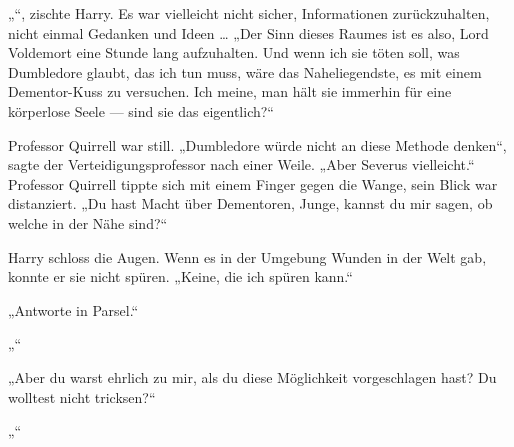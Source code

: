 „“, zischte Harry.
Es war vielleicht nicht sicher, Informationen zurückzuhalten, nicht einmal Gedanken und Ideen …
„Der Sinn dieses Raumes ist es also, Lord Voldemort eine Stunde lang aufzuhalten. Und wenn ich sie töten soll, was Dumbledore glaubt, das ich tun muss, wäre das Naheliegendste, es mit einem Dementor-Kuss zu versuchen. Ich meine, man hält sie immerhin für eine körperlose Seele — sind sie das eigentlich?“

Professor Quirrell war still.
„Dumbledore würde nicht an diese Methode denken“, sagte der Verteidigungsprofessor nach einer Weile.
„Aber Severus vielleicht.“
Professor Quirrell tippte sich mit einem Finger gegen die Wange, sein Blick war distanziert.
„Du hast Macht über Dementoren, Junge, kannst du mir sagen, ob welche in der Nähe sind?“

Harry schloss die Augen. Wenn es in der Umgebung Wunden in der Welt gab, konnte er sie nicht spüren.
„Keine, die ich spüren kann.“

„Antworte in Parsel.“

„“

„Aber du warst ehrlich zu mir, als du diese Möglichkeit vorgeschlagen hast? Du wolltest nicht tricksen?“

„“

